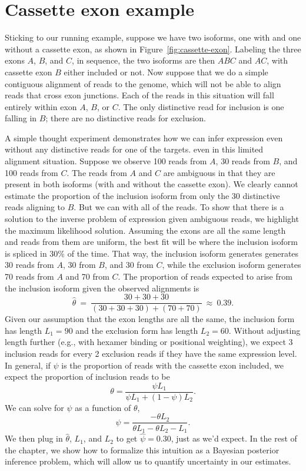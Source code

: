 \documentclass[11pt]{report}
\begin{document}
\section{Cassette exon example}

Sticking to our running example, suppose we have two isoforms, one
with and one without a cassette exon, as shown in
Figure~\ref{fig:cassette-exon}.  Labeling the three exons $A$, $B$,
and $C$, in sequence, the two isoforms are then $ABC$ and $AC$, with
cassette exon $B$ either included or not.  Now suppose that we do a
simple contiguous alignment of reads to the genome, which will not be
able to align reads that cross exon junctions.  Each of the reads in
this situation will fall entirely within exon $A$, $B$, or $C$.  The
only distinctive read for inclusion is one falling in $B$; there are
no distinctive reads for exclusion.

A simple thought experiment demonstrates how we can infer expression
even without any distinctive reads for one of the targets.  even in
this limited alignment situation. Suppose we observe 100 reads from
$A$, 30 reads from $B$, and 100 reads from $C$.  The reads from $A$
and $C$ are ambiguous in that they are present in both isoforms (with
and without the cassette exon).  We clearly cannot estimate the
proportion of the inclusion isoform from only the 30 distinctive reads
aligning to $B$.  But we can with all of the reads.  To show that
there is a solution to the inverse problem of expression given
ambiguous reads, we highlight the maximum likelihood solution.
Assuming the exons are all the same length and reads from them are
uniform, the best fit will be where the inclusion isoform is spliced
in 30\% of the time. That way, the
inclusion isoform generates generates 30 reads from $A$, 30 from $B$,
and 30 from $C$, while the exclusion isoform generates 70 reads from
$A$ and 70 from $C$.  The proportion of reads expected to arise from the
inclusion isoform given the observed alignments is
\[
  \widehat{\theta} \ = \ \frac{30 + 30 + 30}{(30 + 30 + 30) + (70 + 70)}
  \ \approx \ 0.39.
\]
Given our assumption that the exon lengths are all the same, the
inclusion form has length $L_1 = 90$ and the exclusion form has length
$L_2 = 60$.  Without adjusting length further (e.g., with hexamer
binding or positional weighting), we expect 3 inclusion reads for
every 2 exclusion reads if they have the same expression level.  In
general, if $\psi$ is the proportion of reads with the cassette exon
included, we expect the proportion of inclusion reads to be
\[
  \theta = \frac{\psi L_1}{\psi L_1 + (1 - \psi) L_2}.
\]
We can solve for $\psi$ as a function of $\theta$,
\[
  \psi = \frac{-\theta L_2}{\theta L_1 - \theta L_2 - L_1}.
\]
We then plug in $\widehat{\theta}$, $L_1$, and $L_2$ to get
$\widehat{\psi} = 0.30$, just as we'd expect.  In the rest of the chapter,
we show how to formalize this intuition as a Bayesian posterior
inference problem, which will allow us to quantify uncertainty in our
estimates. 
\end{document}
